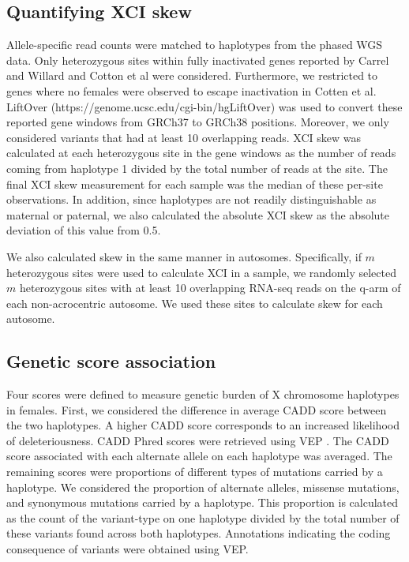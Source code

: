 \subsection{Quantifying XCI skew}

Allele-specific read counts were matched to haplotypes from the phased WGS data. Only heterozygous sites within fully inactivated genes reported by Carrel and Willard \cite{Carrel2005-zm} and Cotton et al \cite{Cotton2013-jl} were considered. Furthermore, we restricted to genes where no females were observed to escape inactivation in Cotten et al. LiftOver (https://genome.ucsc.edu/cgi-bin/hgLiftOver) was used to convert these reported gene windows from GRCh37 to GRCh38 positions. Moreover, we only considered variants that had at least 10 overlapping reads. XCI skew was calculated at each heterozygous site in the gene windows as the number of reads coming from haplotype 1 divided by the total number of reads at the site. The final XCI skew measurement for each sample was the median of these per-site observations. In addition, since haplotypes are not readily distinguishable as maternal or paternal, we also calculated the absolute XCI skew as the absolute deviation of this value from 0.5. 

We also calculated skew in the same manner in autosomes. Specifically, if $m$ heterozygous sites were used to calculate XCI in a sample, we randomly selected $m$ heterozygous sites with at least 10 overlapping RNA-seq reads on the q-arm of each non-acrocentric autosome. We used these sites to calculate skew for each autosome. 

\subsection{Genetic score association}

Four scores were defined to measure genetic burden of X chromosome haplotypes in females. First, we considered the difference in average CADD score \cite{Rentzsch2019-pk} between the two haplotypes. A higher CADD score corresponds to an increased likelihood of deleteriousness. CADD Phred scores were retrieved using VEP \cite{McLaren2016-jd}. The CADD score associated with each alternate allele on each haplotype was averaged. The remaining scores were proportions of different types of mutations carried by a haplotype. We considered the proportion of alternate alleles, missense mutations, and synonymous mutations carried by a haplotype. This proportion is calculated as the count of the variant-type on one haplotype divided by the total number of these variants found across both haplotypes. Annotations indicating the coding consequence of variants were obtained using VEP.

